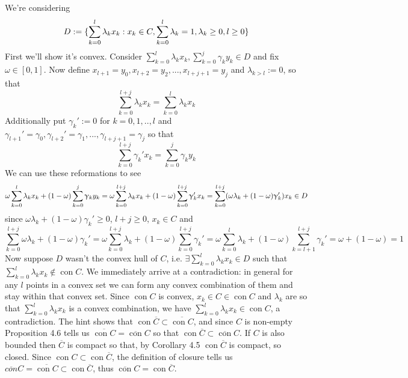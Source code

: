 \documentclass{article}
\newenvironment{ex}[1]
  {\renewcommand\theexercise{#1}\exercise}
  {\endexercise}
\DeclareMathOperator*{\con}{con}
\newcommand{\clo}[1]{\overline{#1}}
\begin{document}
\begin{ex}{4.3} %
  We're considering
  $$
  D := \{ \sum_{k=0}^l \lambda_k x_k : x_k \in C, \sum_{k=0}^l \lambda_k = 1, \lambda_k \ge 0, l \ge 0 \}
  $$
  First we'll show it's convex. Consider $\sum_{k=0}^l \lambda_k x_k, \sum_{k=0}^j \gamma_k y_k \in D$ and fix $\omega \in [0, 1]$. Now define $x_{l+1} = y_0, x_{l+2} = y_2, ..., x_{l+j+1} = y_j$ and $\lambda_{k > l} := 0$, so that
  $$
  \sum_{k=0}^{l + j} \lambda_k x_k = \sum_{k=0}^l \lambda_k x_k
  $$
  Additionally put $\gamma_k' := 0$ for $k = 0, 1, .., l$ and $\gamma_{l+1}' = \gamma_0, \gamma_{l+2}' = \gamma_1, ..., \gamma_{l+j+1} = \gamma_j$ so that
  $$
  \sum_{k=0}^{l + j} \gamma_k' x_k = \sum_{k=0}^j \gamma_k y_k
  $$
  We can use these reformations to see
  $$
  \omega \sum_{k=0}^l \lambda_k x_k + (1-\omega) \sum_{k=0}^j \gamma_k y_k = \omega \sum_{k=0}^{l + j} \lambda_k x_k + (1-\omega) \sum_{k=0}^{l + j} \gamma_k' x_k = \sum_{k=0}^{l + j} \parens{\omega \lambda_k + (1-\omega) \gamma_k'}x_k \in D
  $$
  since $\omega \lambda_k + (1-\omega) \gamma_k' \ge 0$, $l + j \ge 0$, $x_k \in C$ and
  $$
  \sum_{k=0}^{l+j} \omega \lambda_k + (1-\omega) \gamma_k' = \omega \sum_{k=0}^{l+j} \lambda_k + (1-\omega) \sum_{k=0}^{l+j} \gamma_k' = \omega \sum_{k=0}^{l} \lambda_k + (1-\omega) \sum_{k=l+1}^{l+j} \gamma_k' = \omega + (1-\omega) = 1
  $$
  Now suppose $D$ wasn't the convex hull of $C$, i.e. $\exists \sum_{k=0}^l \lambda_k x_k \in D$ such that $\sum_{k=0}^l \lambda_k x_k \not \in \con C$. We immediately arrive at a contradiction: in general for any $l$ points in a convex set we can form any convex combination of them and stay within that convex set. Since $\con C$ is convex, $x_k \in C \in \con C$ and $\lambda_k$ are so that $\sum_{k=0}^l \lambda_k x_k$ is a convex combination, we have $\sum_{k=0}^l \lambda_k x_k \in \con C$, a contradiction.
\end{ex} %
\begin{ex}{4.7} %
  The hint shows that $\con \clo{C} \subset \clo{\con C}$, and since $C$ is non-empty Proposition 4.6 tells us $\clo{\con C} = \clo{\con} C$ so that $\con \clo{C} \subset \clo{\con} C$. If $C$ is also bounded then $\clo{C}$ is compact so that, by Corollary 4.5 $\con \clo{C}$ is compact, so closed. Since $\con C \subset \con \clo{C}$, the definition of closure tells us $\clo{con} C = \clo{\con C} \subset \con \clo{C}$, thus $\clo{\con} C = \con \clo{C}$.
\end{ex} %
\end{document}
